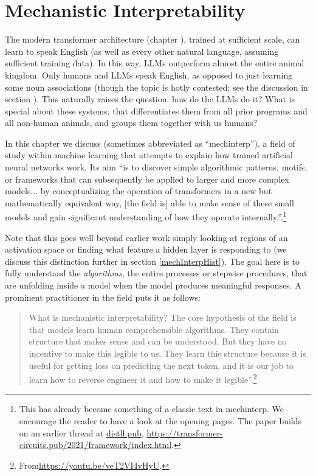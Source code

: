 \chapter{Mechanistic Interpretability}\label{ch_mechinterp}


The modern transformer architecture (chapter ), trained
at sufficient scale, can learn to speak English (as well as every other natural
language, assuming sufficient training data). In this way, LLMs outperform
almost the entire animal kingdom. Only humans and LLMs speak English, as
opposed to just learning some noun associations (though the topic is hotly
contested; see the discussion in section ). This
naturally raises the question: how do the LLMs do it? What is special about
these systems, that differentiates them from all prior programs and all
non-human animals, and groups them together with us humans?

In this chapter we discuss  (sometimes
abbreviated as ``mechinterp''), a field of study within machine learning that
attempts to explain how trained artificial neural networks work. Its aim ``is
to discover simple algorithmic patterns, motifs, or frameworks that can
subsequently be applied to larger and more complex models... by conceptualizing
the operation of transformers in a new but mathematically equivalent way,
[the field is] able to make sense of these small models and
gain significant understanding of how they operate
internally.''\cite{elhage2021mathematical}.\footnote{This has already become
something of a classic text in mechinterp. We encourage the reader to have a
look at the opening pages. The paper builds on an earlier thread at
\url{distll.pub},
\url{https://transformer-circuits.pub/2021/framework/index.html}.} 

Note that this goes well beyond earlier work simply looking at regions of an
activation space or finding what feature a hidden layer is responding to (we
discuss this distinction further in section \ref{mechInterpHist}). The goal
here is to fully understand the \emph{algorithms}, the entire processes or
stepwise procedures, that are unfolding inside a model when the model produces
meaningful responses. A prominent practitioner in the field puts it as follows:

\begin{quote}
What is mechanistic interpretability? The core hypothesis of the field is that
models learn human comprehensible algorithms. They contain structure that makes
sense and can be understood. But they have no incentive to make this legible to
us. They learn this structure because it is useful for getting loss on
predicting the next token, and it is our job to learn how to reverse engineer
it and how to make it
legible''.\footnote{From\url{https://youtu.be/veT2VI4vHyU}.}
\end{quote}

